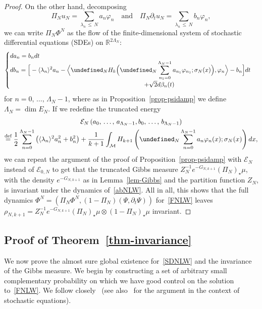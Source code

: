 \documentclass[10pt]{amsart}
\theoremstyle{definition}\newtheorem{defi}[theo]{Definition}\newtheorem{rema}[theo]{Remark}\newtheorem{exam}[theo]{Example}\newtheorem{exem}[theo]{Example}\newtheorem{nota}[theo]{Notation}
\newcommand{\R}{\mathbb{R}}
\newcommand{\deff}{\overset{\textup{def}}{=}}
\let\P= \undefined
\newcommand{\P}{\mathbf{P}}
\newcommand{\En}{\mathcal{E}}
\newcommand{\M}{\mathcal{M}}
\newcommand{\Ld}{\Lambda}
\newcommand{\s}{\sigma}
\newcommand{\dt}{\partial_t}
\newcommand{\jb}[1] {\langle #1 \rangle}
\begin{document}
\begin{proof}
On the other hand, decomposing
\[
\Pi_Nu_N=\sum_{\lambda_n\,\leq\,N}a_n\varphi_n\quad\text{and}\quad\Pi_N\dt u_N = \sum_{\lambda_n\,\leq\,N}b_n\varphi_n,
\]
we can write $\Pi_N\Phi^N$ as the flow of the finite-dimensional system of stochastic differential equations (SDEs) on $\R^{2\Ld_N}$:
\begin{equation}\label{abNLW}
\begin{cases}
da_n = b_ndt\\
{\displaystyle db_n = \Big[-\jb{\lambda_n}^2a_n - \Big\langle \P_NH_k\Big(\P_N\sum_{n_1=0}^{\Ld_N-1} a_{n_1}\varphi_{n_1};\s_N(x)\Big),\varphi_n\Big\rangle - b_n\Big]dt}\\
\mkern390mu+ \sqrt{2}d\beta_n(t)
\end{cases}
\end{equation}
for $n=0,\,\dots,\,\Ld_N-1$, where as in Proposition~\ref{prop-psidamp} we define $\Ld_N = \dim E_N$. If we redefine the truncated energy
\begin{multline*}
\En_N\left(a_0,\,\dots,\,a_{\Ld_N-1},b_0,\,\dots,\,b_{\Ld_N-1}\right)\\
\deff \frac12\sum_{n=0}^{\Ld_N-1} \left(\jb{\lambda_n}^2a_n^2+b_n^2\right)
 + \frac{1}{k+1}\int_{\M}H_{k+1}\left(\P_N\sum_{n=0}^{\Ld_N-1}a_n\varphi_n(x);\s_N(x)\right)dx,
\end{multline*}
we can repeat the argument of the proof of Proposition~\ref{prop-psidamp} with $\En_N$ instead of $\En_{0,N}$ to get that the truncated Gibbs measure $Z_N^{-1}e^{-G_{N,k+1}}(\Pi_N)_{\star}\mu$, with the density $e^{-G_{N,k+1}}$ as in Lemma~\ref{lem-Gibbs} and the partition function $Z_N$, is invariant under the dynamics of~\eqref{abNLW}. All in all, this shows that the full dynamics $\Phi^N = (\Pi_N\Phi^N,(1-\Pi_N)(\Psi,\dt\Psi))$ for~\eqref{FNLW} leaves $\rho_{N,k+1} = Z_N^{-1}e^{-G_{N,k+1}}(\Pi_N)_\star\mu\otimes(1-\Pi_N)_\star\mu$ invariant.
\end{proof}

\subsection{Proof of Theorem~\ref{thm-invariance}}
We now prove the almost sure global existence for~\eqref{SDNLW} and the invariance of the Gibbs measure. We begin by constructing a set of arbitrary small complementary probability on which we have good control on the solution to~\eqref{FNLW}. We follow closely~\cite{BTT2} (see also~\cite{HM} for the argument in the context of stochastic equations).
\end{document}
